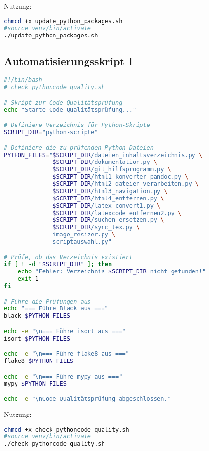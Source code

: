 \documentclass{vorlage-design-main}
\begin{document}
Nutzung:

\begin{lstlisting}[language=bash]
chmod +x update_python_packages.sh
#source venv/bin/activate
./update_python_packages.sh
\end{lstlisting}

\newpage

\subsection{Automatisierungsskript I}\label{automatisierungsskript-i-1}

\begin{lstlisting}[language=bash]
#!/bin/bash
# check_pythoncode_quality.sh

# Skript zur Code-Qualitätsprüfung
echo "Starte Code-Qualitätsprüfung..."

# Definiere Verzeichnis für Python-Skripte
SCRIPT_DIR="python-scripte"

# Definiere die zu prüfenden Python-Dateien
PYTHON_FILES="$SCRIPT_DIR/dateien_inhaltsverzeichnis.py \
              $SCRIPT_DIR/dokumentation.py \
              $SCRIPT_DIR/git_hilfsprogramm.py \
              $SCRIPT_DIR/html1_konverter_pandoc.py \
              $SCRIPT_DIR/html2_dateien_verarbeiten.py \
              $SCRIPT_DIR/html3_navigation.py \
              $SCRIPT_DIR/html4_entfernen.py \
              $SCRIPT_DIR/latex_convert1.py \
              $SCRIPT_DIR/latexcode_entfernen2.py \
              $SCRIPT_DIR/suchen_ersetzen.py \
              $SCRIPT_DIR/sync_tex.py \
              image_resizer.py \
              scriptauswahl.py"

# Prüfe, ob das Verzeichnis existiert
if [ ! -d "$SCRIPT_DIR" ]; then
    echo "Fehler: Verzeichnis $SCRIPT_DIR nicht gefunden!"
    exit 1
fi

# Führe die Prüfungen aus
echo "=== Führe Black aus ==="
black $PYTHON_FILES

echo -e "\n=== Führe isort aus ==="
isort $PYTHON_FILES

echo -e "\n=== Führe flake8 aus ==="
flake8 $PYTHON_FILES

echo -e "\n=== Führe mypy aus ==="
mypy $PYTHON_FILES

echo -e "\nCode-Qualitätsprüfung abgeschlossen."
\end{lstlisting}

Nutzung:

\begin{lstlisting}[language=bash]
chmod +x check_pythoncode_quality.sh
#source venv/bin/activate
./check_pythoncode_quality.sh
\end{lstlisting}



\clearpage
\printbibliography
\end{document}
